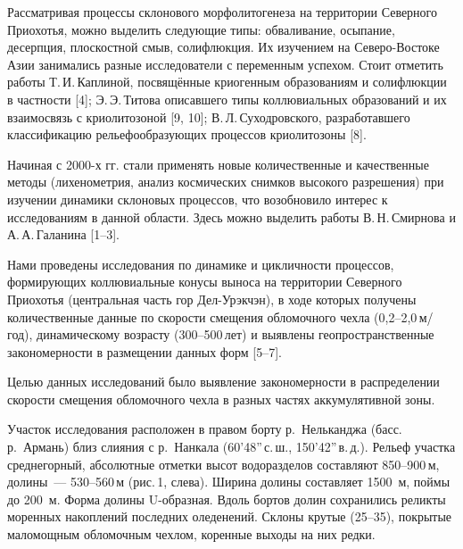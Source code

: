  

\makeProcTitleNewLine
{}

Рассматривая процессы склонового морфолитогенеза на территории Северного Приохотья,
можно выделить следующие типы: обваливание, осыпание, десерпция, плоскостной смыв, солифлюкция.
Их изучением на Северо-Востоке Азии занимались разные исследователи с переменным успехом.
Стоит отметить работы Т.\,И.\,Каплиной, посвящённые криогенным образованиям
и солифлюкции в частности [4]; Э.\,Э.\,Титова описавшего типы коллювиальных образований
и их взаимосвязь с криолитозоной [9, 10]; В.\,Л.\,Суходровского, разработавшего классификацию рельефообразующих процессов криолитозоны [8].

Начиная с 2000-х гг. стали применять новые количественные и качественные методы (лихенометрия, анализ космических снимков высокого разрешения) при изучении динамики склоновых процессов,
что возобновило интерес к исследованиям в данной области. Здесь можно выделить работы В.\,Н.\,Смирнова и А.\,А.\,Галанина [1--3].

Нами проведены исследования по динамике и цикличности процессов, формирующих коллювиальные конусы выноса на территории Северного Приохотья (центральная часть гор Дел-Урэкчэн), в ходе которых получены количественные данные по скорости смещения обломочного чехла (0,2--2,0\,м/год), динамическому возрасту (300--500\,лет) и выявлены геопространственные закономерности в размещении данных форм [5--7].

Целью данных исследований было выявление закономерности в распределении скорости смещения обломочного чехла в разных частях аккумулятивной зоны.

Участок исследования расположен в правом борту р.~Нельканджа (басс. р.~Армань) близ слияния с р.~Нанкала (60’48”\,с.\,ш., 150’42”\,в.\,д.). Рельеф участка среднегорный, абсолютные отметки высот водоразделов составляют 850--900\,м, долины~--- 530--560\,м (рис.\,1, слева). Ширина долины составляет 1500~м, поймы до 200~м. Форма долины U-образная. Вдоль бортов долин сохранились реликты моренных накоплений последних оледенений. Склоны крутые (25--35\dg), покрытые маломощным обломочным чехлом, коренные выходы на них редки.

